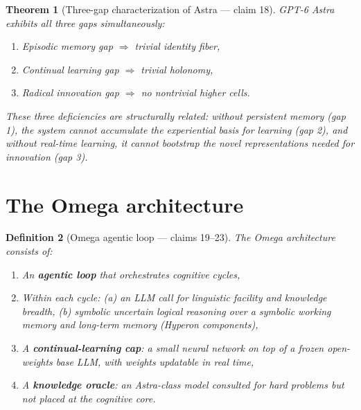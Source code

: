 \documentclass[11pt,a4paper]{article}
\newtheorem{definition}{Definition}[section]
\newtheorem{theorem}[definition]{Theorem}
\begin{document}
\begin{theorem}[Three-gap characterization of Astra --- claim 18]
\label{thm:three-gaps}
GPT-6 Astra exhibits all three gaps simultaneously:
\begin{enumerate}
\item Episodic memory gap $\Rightarrow$ trivial identity fiber,
\item Continual learning gap $\Rightarrow$ trivial holonomy,
\item Radical innovation gap $\Rightarrow$ no nontrivial higher cells.
\end{enumerate}
These three deficiencies are structurally related: without persistent
memory (gap 1), the system cannot accumulate the experiential basis for
learning (gap 2), and without real-time learning, it cannot bootstrap
the novel representations needed for innovation (gap 3).
\end{theorem}

\section{The Omega architecture}
\label{sec:omega}

\begin{definition}[Omega agentic loop --- claims 19--23]
\label{def:omega-loop}
The Omega architecture consists of:
\begin{enumerate}
\item An \textbf{agentic loop} that orchestrates cognitive cycles,
\item Within each cycle: (a) an LLM call for linguistic facility and
  knowledge breadth, (b) symbolic uncertain logical reasoning over
  a symbolic working memory and long-term memory (Hyperon components),
\item A \textbf{continual-learning cap}: a small neural network on top
  of a frozen open-weights base LLM, with weights updatable in real time,
\item A \textbf{knowledge oracle}: an Astra-class model consulted for
  hard problems but not placed at the cognitive core.
\end{enumerate}
\end{definition}
\end{document}
